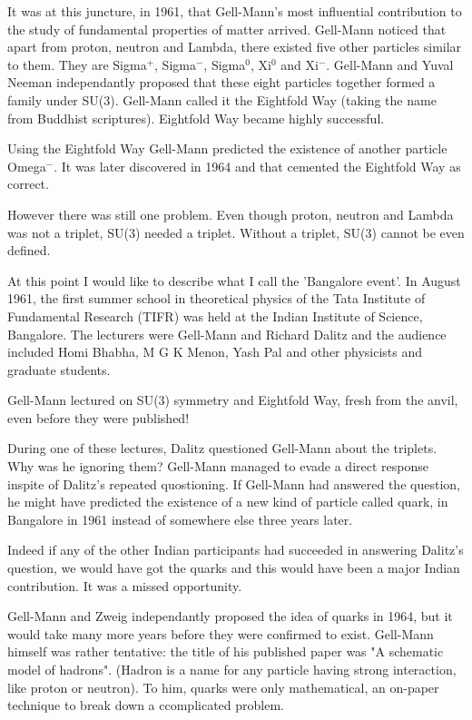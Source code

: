 It was at this juncture, in 1961, that Gell-Mann's most influential
contribution to the study of fundamental properties of matter arrived.
Gell-Mann noticed that apart from proton, neutron and Lambda, there
existed five other particles similar to them. They are Sigma${^+}$, Sigma$^{-}$,
Sigma${^0}$, Xi${^0}$ and Xi${^-}$. Gell-Mann and Yuval Neeman independantly proposed
that these eight particles together formed a family under SU(3). Gell-Mann
called it the Eightfold Way (taking the name from Buddhist scriptures).
Eightfold Way became highly successful.

Using the Eightfold Way Gell-Mann predicted the existence of another particle
Omega${^-}$. It was later discovered in 1964 and that cemented the Eightfold Way as
correct.

However there was still one problem. Even though proton, neutron and Lambda
was not a triplet, SU(3) needed a triplet. Without a triplet, SU(3) cannot
be even defined.


At this point I would like to describe what I call the 'Bangalore event'.
In August 1961, the first summer school in theoretical physics of the
Tata Institute of Fundamental Research (TIFR) was held at the Indian
Institute of Science, Bangalore. The lecturers were Gell-Mann and Richard
Dalitz and the audience included Homi Bhabha, M G K Menon, Yash Pal and
other physicists and graduate students.

Gell-Mann lectured on SU(3) symmetry and Eightfold Way, fresh from the
anvil, even before they were published!

During one of these lectures, Dalitz questioned Gell-Mann about the triplets.
Why was he ignoring them? Gell-Mann managed to evade a direct response inspite
of Dalitz's repeated quostioning. If Gell-Mann had answered the question, he
might have predicted the existence of a new kind of particle called quark,
in Bangalore in 1961 instead of somewhere else three years later.

\newpage

Indeed if any of the other Indian participants had succeeded in answering
Dalitz's question, we would have got the quarks and this would have been
a major Indian contribution. It was a missed opportunity.

Gell-Mann and Zweig independantly proposed the idea of quarks in 1964,
but it would take many more years before they were confirmed to exist.
Gell-Mann himself was rather tentative: the title of his published paper
was "A schematic model of hadrons". (Hadron is a name for any particle
having strong interaction, like proton or neutron). To him, quarks were
only mathematical, an on-paper technique to break down a ccomplicated
problem.

